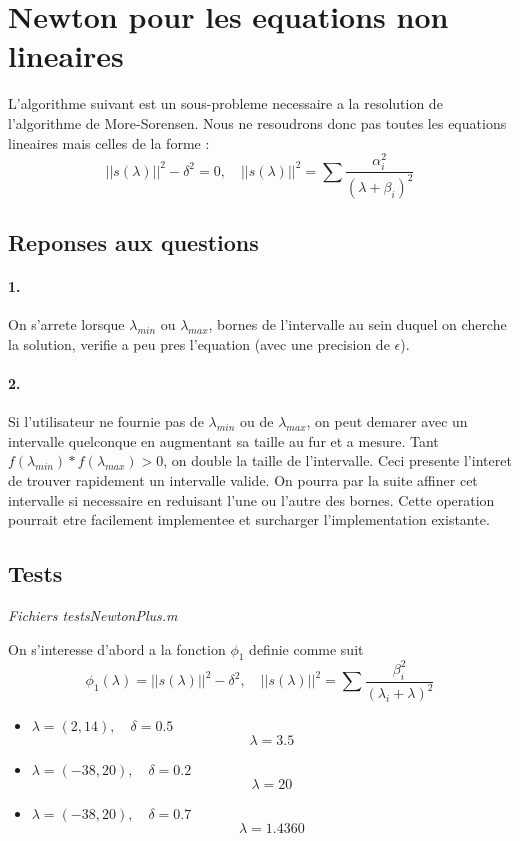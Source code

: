 \documentclass[12pt]{article}
\begin{document}
\section{Newton pour les equations non lineaires}
L'algorithme suivant est un sous-probleme necessaire a la resolution de l'algorithme de More-Sorensen. Nous ne resoudrons donc pas toutes les equations lineaires mais celles de la forme : \[||s(\lambda)||^2 - \delta^2 = 0,\quad ||s(\lambda)||^2 = \sum{\frac{\alpha_i^2}{(\lambda + \beta_i)^2}}\]


\subsection{Reponses aux questions}
\paragraph{1.}
On s'arrete lorsque $\lambda_{min}$ ou $\lambda_{max}$, bornes de l'intervalle au sein duquel on cherche la solution, verifie a peu pres l'equation (avec une precision de $\epsilon$).
\paragraph{2.}
Si l'utilisateur ne fournie pas de $\lambda_{min}$ ou de $\lambda_{max}$, on peut demarer avec un intervalle quelconque en augmentant sa taille au fur et a mesure. Tant $f(\lambda_{min}) * f(\lambda_{max}) > 0$, on double la taille de l'intervalle. Ceci presente l'interet de trouver rapidement un intervalle valide. On pourra par la suite affiner cet intervalle si necessaire en reduisant l'une ou l'autre des bornes.\newline
Cette operation pourrait etre facilement implementee et surcharger l'implementation existante.

\subsection{Tests}
\begin{flushright}
\textit{Fichiers testsNewtonPlus.m}
\end{flushright}
On s'interesse d'abord a la fonction $\phi_1$ definie comme suit
	\[\phi_1(\lambda) = ||s(\lambda)||^2 - \delta^2,\quad ||s(\lambda)||^2 = \sum{\frac{\beta_i^2}{(\lambda_i + \lambda)^2}}\]
\begin{itemize}
	\item $\lambda = (2, 14), \quad \delta = 0.5$
		\[\lambda = 3.5\]
	\item $\lambda = (-38, 20), \quad \delta = 0.2$
		\[\lambda = 20\]
	\item $\lambda = (-38, 20),\quad \delta = 0.7$
		\[\lambda = 1.4360\]
\end{itemize}
\end{document}
